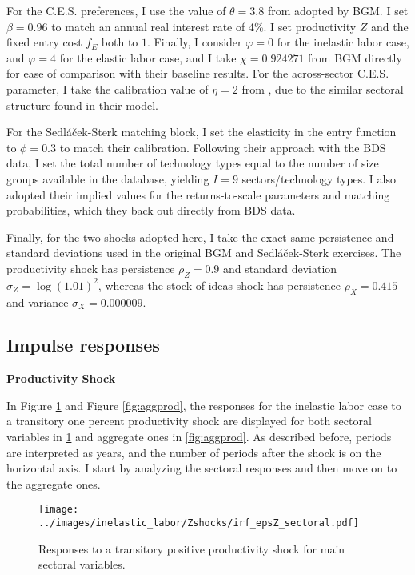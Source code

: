\documentclass[a4paper,12pt]{article} %
\numberwithin{equation}{section} %
\numberwithin{figure}{section}
\numberwithin{table}{section}
\begin{document}
For the C.E.S. preferences, I use the value of $\theta = 3.8$ from \textcite{bernard2003plants} 
adopted by BGM. I set $\beta = 0.96$ to match an annual real interest rate of 4\%. I set productivity $Z$ and 
the fixed entry cost $f_E$ both to $1$. Finally, I consider $\varphi = 0$ for the inelastic labor case, 
and $\varphi = 4$ for the elastic labor case, and I take $\chi = 0.924271$ from BGM directly for ease of comparison
with their baseline results. For the across-sector C.E.S. parameter, I take the calibration value of $\eta = 2$ from
\textcite{carvalho2021sectoral}, due to the similar sectoral structure found in their model.

For the Sedláček-Sterk matching block, I set the elasticity in the entry function to $\phi = 0.3$ to match their 
calibration. Following their approach with the BDS data, I set the total number of technology types equal to the
number of size groups available in the database, yielding $I = 9$ sectors/technology types. I also adopted their
implied values for the returns-to-scale parameters and matching probabilities, which they back out directly from
BDS data. 

Finally, for the two shocks adopted here, I take the exact same persistence and standard deviations used in the 
original BGM and Sedláček-Sterk exercises. The productivity shock has
persistence $\rho_Z =0.9$ and standard deviation $\sigma_Z = \log (1.01)^2$, whereas the stock-of-ideas shock has 
persistence $\rho_X = 0.415$ and variance $\sigma_X = 0.000009$. 

\subsection{Impulse responses}
\label{sec:quant-IRF}

\medskip
\medskip
\noindent\textbf{Productivity Shock}
\medskip

In Figure \ref{fig:multiprod} and Figure \ref{fig:aggprod}, the responses for the inelastic labor case
to a transitory one percent productivity shock are displayed for both sectoral variables in 
\ref{fig:multiprod} and aggregate ones in \ref{fig:aggprod}. As described before, periods are interpreted as years,
and the number of periods after the shock is on the horizontal axis. I start by analyzing the sectoral responses and
then move on to the aggregate ones. 

\begin{figure}[H]
  \centering
  \texttt{[image: ../images/inelastic\_labor/Zshocks/irf\_epsZ\_sectoral.pdf]}
  \caption{Responses to a transitory positive productivity shock for main sectoral variables.}
  \label{fig:multiprod}
\end{figure}
\end{document}

